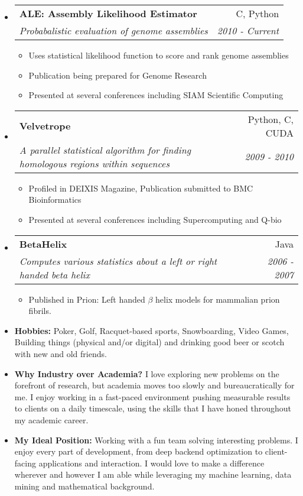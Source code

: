 \documentclass[letterpaper,1opt]{article}
\makeatletter
\newlength{\outerbordwidth}
\newcommand{\resitem}[1]{\item #1 \vspace{-2pt}}
\newcommand{\resheading}[1]{\vspace{8pt}
  \parbox{\textwidth}{\setlength{\FrameSep}{\outerbordwidth}
    \begin{shaded}
\setlength{\fboxsep}{0pt}\framebox[\textwidth][l]{\setlength{\fboxsep}{4pt}\fcolorbox{shadecolorB}{shadecolorB}{\textbf{\sffamily{\mbox{~}\makebox[6.762in][l]{\large #1} \vphantom{p\^{E}}}}}}
    \end{shaded}
  }\vspace{-5pt}
}
\newcommand{\ressubheading}[4]{
\begin{tabular*}{6.5in}{l@{\cftdotfill{\cftsecdotsep}\extracolsep{\fill}}r}
		\textbf{#1} & #2 \\
		\textit{#3} & \textit{#4} \\
\end{tabular*}\vspace{-6pt}}
\makeatother
\begin{document}
		\begin{itemize}

		\item \ressubheading{ALE: Assembly Likelihood Estimator}{C, Python}{Probabalistic evaluation of genome assemblies}{2010 - Current}

		  \begin{itemize}
		    \resitem{Uses statistical likelihood function to score and rank genome assemblies}
				\resitem{Publication being prepared for Genome Research}
		    \resitem{Presented at several conferences including SIAM Scientific Computing}
			\end{itemize}

		\item \ressubheading{Velvetrope}{Python, C, CUDA}{A parallel statistical algorithm for finding homologous regions within sequences}{2009 - 2010}

		  \begin{itemize}
				\resitem{Profiled in DEIXIS Magazine, Publication submitted to BMC Bioinformatics}
		    \resitem{Presented at several conferences including Supercomputing and Q-bio}
			\end{itemize}

		\item \ressubheading{BetaHelix}{Java}{Computes various statistics about a left or right handed beta helix}{2006 - 2007}

		\begin{itemize}
				\resitem{Published in Prion: Left handed $\beta$ helix models for mammalian prion fibrils.}
		\end{itemize}


		\end{itemize}
		
		
		\resheading{Personal}


		\begin{itemize}

		\item {\bf Hobbies:} Poker, Golf, Racquet-based sports, Snowboarding, Video Games, Building things (physical and/or digital) and drinking good beer or scotch with new and old friends.

		\item {\bf Why Industry over Academia?} I love exploring new problems on the forefront of research, but academia moves too slowly and bureaucratically for me. I enjoy working in a fast-paced environment pushing measurable results to clients on a daily timescale, using the skills that I have honed throughout my academic career.

		\item {\bf My Ideal Position:} Working with a fun team solving interesting problems. I enjoy every part of development, from deep backend optimization to client-facing applications and interaction. I would love to make a difference wherever and however I am able while leveraging my machine learning, data mining and mathematical background.

		\end{itemize}
\end{document}
